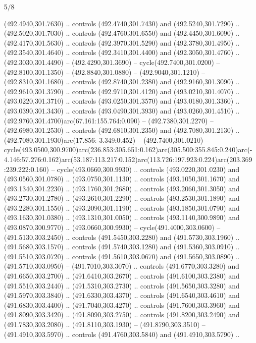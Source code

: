 \begin{flagdescription}{5/8}
\begin{scope}[xshift=0.5\flaglength,yshift=0.5\flagwidth,scale=\flagwidth/475.63]
\begin{scope}[y=0.8pt, x=0.8pt, yscale=-1, xscale=1,shift={(-450,-300)}]
\begin{scope}[cm={{1.0,0.0,0.0,1.0,(-0.0002,0.12556)}},cm={{1.0,0.0,0.0,1.0,(0.00179,0.0)}}]
\begin{scope}[cm={{1.11592,0.0,0.0,1.11592,(-106.89933,-41.77764)}}]
\begin{scope}[draw=black,fill=cfff]
\begin{scope}[fill=black]
  (492.4940,301.7630) .. controls (492.4740,301.7430) and (492.5240,301.7290) ..
  (492.5020,301.7030) .. controls (492.4760,301.6550) and (492.4450,301.6090) ..
  (492.4170,301.5630) .. controls (492.3970,301.5290) and (492.3780,301.4950) ..
  (492.3540,301.4640) .. controls (492.3410,301.4400) and (492.3050,301.4760) ..
  (492.3030,301.4490) -- (492.4290,301.3690) -- cycle(492.7400,301.0200) --
  (492.8100,301.1350) -- (492.8840,301.0880) -- (492.9040,301.1210) --
  (492.8310,301.1680) .. controls (492.8740,301.2380) and (492.9160,301.3090) ..
  (492.9610,301.3790) .. controls (492.9710,301.4120) and (493.0210,301.4070) ..
  (493.0220,301.3710) .. controls (493.0250,301.3570) and (493.0180,301.3360) ..
  (493.0390,301.3430) .. controls (493.0490,301.3930) and (493.0260,301.4510) ..
  (492.9760,301.4700)arc(67.161:155.764:0.090) -- (492.7380,301.2270) --
  (492.6980,301.2530) .. controls (492.6810,301.2350) and (492.7080,301.2130) ..
  (492.7080,301.1930)arc(17.856:-3.349:0.452) -- (492.7400,301.0210) --
  cycle(493.0500,300.9700)arc(236.853:305.651:0.162)arc(305.500:355.845:0.240)arc(-4.146:57.276:0.162)arc(53.187:113.217:0.152)arc(113.726:197.923:0.224)arc(203.369:239.222:0.160)
  -- cycle(493.0660,300.9930) .. controls (493.0220,301.0230) and
  (493.0560,301.0780) .. (493.0750,301.1130) .. controls (493.1050,301.1670) and
  (493.1340,301.2230) .. (493.1760,301.2680) .. controls (493.2060,301.3050) and
  (493.2730,301.2780) .. (493.2610,301.2290) .. controls (493.2530,301.1890) and
  (493.2280,301.1550) .. (493.2090,301.1190) .. controls (493.1850,301.0790) and
  (493.1630,301.0380) .. (493.1310,301.0050) .. controls (493.1140,300.9890) and
  (493.0870,300.9770) .. (493.0660,300.9930) -- cycle(491.4000,303.0600) --
  (491.5130,303.2450) .. controls (491.5450,303.2280) and (491.5730,303.1960) ..
  (491.5680,303.1570) .. controls (491.5740,303.1280) and (491.5360,303.0910) ..
  (491.5510,303.0720) .. controls (491.5610,303.0670) and (491.5650,303.0890) ..
  (491.5710,303.0950) -- (491.7010,303.3070) .. controls (491.6770,303.3280) and
  (491.6650,303.2700) .. (491.6410,303.2670) .. controls (491.6100,303.2380) and
  (491.5510,303.2440) .. (491.5310,303.2730) .. controls (491.5650,303.3280) and
  (491.5970,303.3840) .. (491.6330,303.4370) .. controls (491.6540,303.4610) and
  (491.6830,303.4400) .. (491.7040,303.4270) .. controls (491.7600,303.3960) and
  (491.8090,303.3420) .. (491.8090,303.2750) .. controls (491.8200,303.2490) and
  (491.7830,303.2080) .. (491.8110,303.1930) -- (491.8790,303.3510) --
  (491.4910,303.5970) .. controls (491.4760,303.5840) and (491.4910,303.5790) ..

\end{scope}
\end{scope}
\end{scope}
\end{scope}
\end{scope}
\end{scope}
\end{flagdescription}
